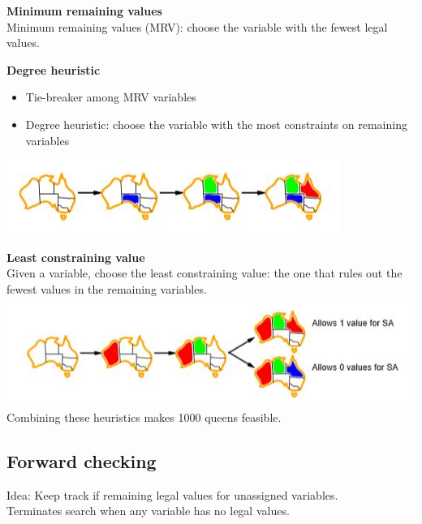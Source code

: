 \textbf{Minimum remaining values}\\
Minimum remaining values (MRV): choose the variable with the fewest legal values.

\textbf{Degree heuristic}\\
\begin{itemize}
\item Tie-breaker among MRV variables
\item Degree heuristic: choose the variable with the most constraints on remaining variables 
\end{itemize}
\includegraphics[scale=1]{chap1_pics/backtrack2.jpeg}

\textbf{Least constraining value}\\
Given a variable, choose the least constraining value: the one that rules out the fewest values in the remaining variables.\\

\includegraphics[scale=1]{chap1_pics/backtrack3.jpeg}
Combining these heuristics makes 1000 queens feasible.\\


\subsection{Forward checking}
Idea: Keep track if remaining legal values for unassigned variables.\\
Terminates search when any variable has no legal values.\\

